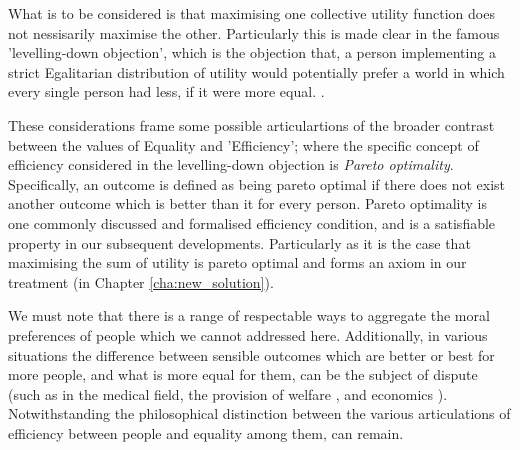 What is to be considered is that maximising one collective utility function does not nessisarily maximise the other.
Particularly this is made clear in the famous 'levelling-down objection', which is the objection that, a person implementing a strict Egalitarian distribution of utility would potentially prefer a world in which every single person had less, if it were more equal. \cite{temkin_2003, equalityandpriorityparfit}.

These considerations frame some possible articulartions of the broader contrast between the values of Equality and 'Efficiency'; where the specific concept of efficiency considered in the levelling-down objection is \textit{Pareto optimality}.
Specifically, an outcome is defined as being pareto optimal if there does not exist another outcome which is better than it for every person.
Pareto optimality is one commonly discussed and formalised efficiency condition, and is a satisfiable property in our subsequent developments.
Particularly as it is the case that maximising the sum of utility is pareto optimal \cite{TheoriesofValueAggregation} and forms an axiom in our treatment (in Chapter \ref{cha:new_solution}).

We must note that there is a range of respectable ways to aggregate the moral preferences of people which we cannot addressed here.
Additionally, in various situations the difference between sensible outcomes which are better or best for more people, and what is more equal for them, can be the subject of dispute (such as in the medical field\cite{Reidpath2012,RePEc:chy:respap:120cherp}, the provision of welfare \cite{10.2307/27522452}, and economics \cite{10.1093/oep/gpz040}). Notwithstanding the philosophical distinction between the various articulations of efficiency between people and equality among them, can remain.



